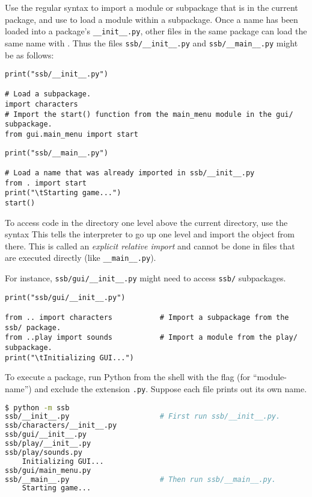 Use the regular syntax to import a module or subpackage that is in the current package, and use  to load a module within a subpackage.
Once a name has been loaded into a package's \texttt{\_\_init\_\_.py}, other files in the same package can load the same name with .
Thus the files \texttt{ssb/\_\_init\_\_.py} and \texttt{ssb/\_\_main\_\_.py} might be as follows:

\begin{lstlisting}
print("ssb/__init__.py")

# Load a subpackage.
import characters
# Import the start() function from the main_menu module in the gui/ subpackage.
from gui.main_menu import start
\end{lstlisting}

\begin{lstlisting}
print("ssb/__main__.py")

# Load a name that was already imported in ssb/__init__.py
from . import start
print("\tStarting game...")
start()
\end{lstlisting}

To access code in the directory one level above the current directory, use the syntax 
This tells the interpreter to go up one level and import the object from there.
This is called an \emph{explicit relative import} and cannot be done in files that are executed directly (like \texttt{\_\_main\_\_.py}).

For instance, \texttt{ssb/gui/\_\_init\_\_.py} might need to access \texttt{ssb/} subpackages.

\begin{lstlisting}
print("ssb/gui/__init__.py")

from .. import characters           # Import a subpackage from the ssb/ package.
from ..play import sounds           # Import a module from the play/ subpackage.
print("\tInitializing GUI...")
\end{lstlisting}

To execute a package, run Python from the shell with the flag  (for ``module-name'') and exclude the extension \texttt{.py}.
Suppose each file prints out its own name.

\begin{lstlisting}[language=bash]
$ python -m ssb
ssb/__init__.py                     # First run ssb/__init__.py.
ssb/characters/__init__.py
ssb/gui/__init__.py
ssb/play/__init__.py
ssb/play/sounds.py
    Initializing GUI...
ssb/gui/main_menu.py
ssb/__main__.py                     # Then run ssb/__main__.py.
    Starting game...
\end{lstlisting}

